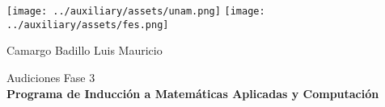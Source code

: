 \begin{titlepage}
    \begin{center}
        \texttt{[image: ../auxiliary/assets/unam.png]}
        \hspace{0.6\textwidth}
        \texttt{[image: ../auxiliary/assets/fes.png]}

        \vspace*{7.5cm}
        \huge
        \textbf{\titulo}

        \vspace{1cm}
        \large
        Camargo Badillo Luis Mauricio \\
        \vspace{1.5cm}

        \vfill

        \vspace{0.5cm}
        Audiciones Fase 3 \\
        \textbf{Programa de Inducción a Matemáticas Aplicadas y Computación}\\
    \end{center}
\end{titlepage}
